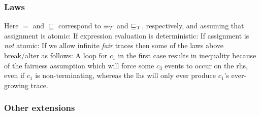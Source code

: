 \subsubsection{Laws}


Here $=$ and $\sqsubseteq$ correspond to $\equiv_{\mathcal{T}}$ and $\sqsubseteq_{\mathcal{T}}$, respectively,
and assuming that assignment is atomic:
If expression evaluation is deterministic:
If assignment is \emph{not} atomic:
If we allow infinite \emph{fair} traces then some of the laws above break/alter as follows:
A loop for $c_1$ in the first case results in inequality because
of the fairness assumption which will force some $c_3$ events to occur
on the rhs, even if $c_1$ is non-terminating,
whereas the lhs will only ever produce $c_1$'s ever-growing trace.

\subsubsection{Other extensions}

